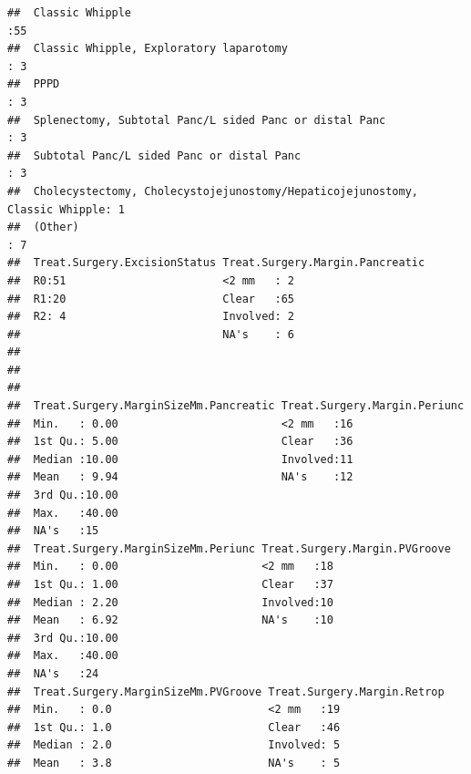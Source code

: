 \documentclass{article}\usepackage[]{graphicx}\usepackage[]{color}
\makeatletter
\newenvironment{kframe}{%
 \def\at@end@of@kframe{}%
 \ifinner\ifhmode%
  \def\at@end@of@kframe{\end{minipage}}%
  \begin{minipage}{\columnwidth}%
 \fi\fi%
 \def\FrameCommand##1{\hskip\@totalleftmargin \hskip-\fboxsep
 \colorbox{shadecolor}{##1}\hskip-\fboxsep
     \hskip-\linewidth \hskip-\@totalleftmargin \hskip\columnwidth}%
 \MakeFramed {\advance\hsize-\width
   \@totalleftmargin\z@ \linewidth\hsize
   \@setminipage}}%
 {\par\unskip\endMakeFramed%
 \at@end@of@kframe}
\newenvironment{knitrout}{}{} %
\makeatother
\begin{document}
\begin{knitrout}
\begin{kframe}
\begin{verbatim}
##  Classic Whipple                                                            :55        
##  Classic Whipple, Exploratory laparotomy                                    : 3        
##  PPPD                                                                       : 3        
##  Splenectomy, Subtotal Panc/L sided Panc or distal Panc                     : 3        
##  Subtotal Panc/L sided Panc or distal Panc                                  : 3        
##  Cholecystectomy, Cholecystojejunostomy/Hepaticojejunostomy, Classic Whipple: 1        
##  (Other)                                                                    : 7        
##  Treat.Surgery.ExcisionStatus Treat.Surgery.Margin.Pancreatic
##  R0:51                        <2 mm   : 2                    
##  R1:20                        Clear   :65                    
##  R2: 4                        Involved: 2                    
##                               NA's    : 6                    
##                                                              
##                                                              
##                                                              
##  Treat.Surgery.MarginSizeMm.Pancreatic Treat.Surgery.Margin.Periunc
##  Min.   : 0.00                         <2 mm   :16                 
##  1st Qu.: 5.00                         Clear   :36                 
##  Median :10.00                         Involved:11                 
##  Mean   : 9.94                         NA's    :12                 
##  3rd Qu.:10.00                                                     
##  Max.   :40.00                                                     
##  NA's   :15                                                        
##  Treat.Surgery.MarginSizeMm.Periunc Treat.Surgery.Margin.PVGroove
##  Min.   : 0.00                      <2 mm   :18                  
##  1st Qu.: 1.00                      Clear   :37                  
##  Median : 2.20                      Involved:10                  
##  Mean   : 6.92                      NA's    :10                  
##  3rd Qu.:10.00                                                   
##  Max.   :40.00                                                   
##  NA's   :24                                                      
##  Treat.Surgery.MarginSizeMm.PVGroove Treat.Surgery.Margin.Retrop
##  Min.   : 0.0                        <2 mm   :19                
##  1st Qu.: 1.0                        Clear   :46                
##  Median : 2.0                        Involved: 5                
##  Mean   : 3.8                        NA's    : 5                

\end{verbatim}
\end{kframe}
\end{knitrout}
\end{document}
